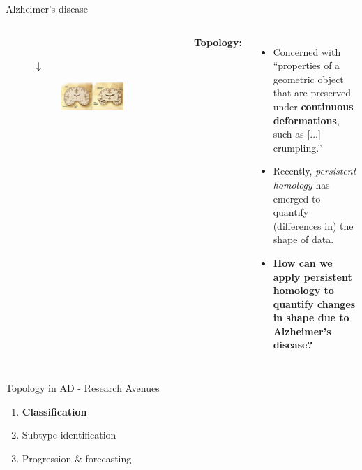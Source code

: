 \documentclass[aspectratio=169, 10pt, dvipsnames]{beamer}
\begin{document}
\begin{frame}[fragile]{Alzheimer's disease}
\begin{columns}[T,onlytextwidth]
{\begin{figure}
\begin{subfigure}{0.2\textwidth}
        \end{subfigure}\\
        \centering
        $\downarrow$\\
        \begin{subfigure}{\textwidth}
          \centering
          \includegraphics[width=\textwidth]{figures/AD_brain_comparison.jpg}
        \end{subfigure}
      \end{figure}
    }
    \textbf{Topology:} \doughnut \mug
    \begin{itemize}
     \item Concerned with ``properties of a geometric object that are preserved under \textbf{continuous deformations}, such as [...] crumpling.''
    \item Recently, \textit{persistent homology} has emerged to quantify (differences in) the shape of data.
    \item \textbf{How can we apply persistent homology to quantify changes in shape due to Alzheimer's disease?}
    \end{itemize}
    \end{columns}
\end{frame}


\begin{frame}[fragile]{Topology in AD - Research Avenues \compass}
  \begin{enumerate}
  \item \textbf{Classification}
  \item Subtype identification
  \item Progression \& forecasting
  \end{enumerate}
\end{frame}
\end{document}
